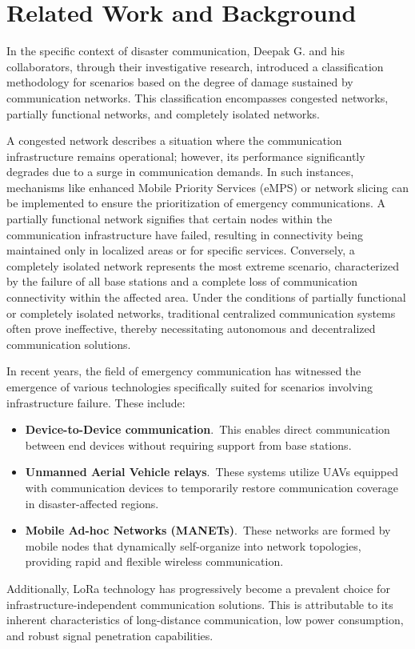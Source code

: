 \section{Related Work and Background}
In the specific context of disaster communication, Deepak G. and his collaborators, through their investigative research, introduced a classification methodology for scenarios based on the degree of damage sustained by communication networks. This classification encompasses congested networks, partially functional networks, and completely isolated networks\cite{Post-DisasterEmergencyCommunicationSystems}.

A congested network describes a situation where the communication infrastructure remains operational; however, its performance significantly degrades due to a surge in communication demands. In such instances, mechanisms like enhanced Mobile Priority Services (eMPS) or network slicing can be implemented to ensure the prioritization of emergency communications. A partially functional network signifies that certain nodes within the communication infrastructure have failed, resulting in connectivity being maintained only in localized areas or for specific services. Conversely, a completely isolated network represents the most extreme scenario, characterized by the failure of all base stations and a complete loss of communication connectivity within the affected area. Under the conditions of partially functional or completely isolated networks, traditional centralized communication systems often prove ineffective, thereby necessitating autonomous and decentralized communication solutions.

In recent years, the field of emergency communication has witnessed the emergence of various technologies specifically suited for scenarios involving infrastructure failure. These include:
    \begin{itemize}
        \item \textbf{Device-to-Device communication}.\ This enables direct communication between end devices without requiring support from base stations.
        \item \textbf{Unmanned Aerial Vehicle relays}.\  These systems utilize UAVs equipped with communication devices to temporarily restore communication coverage in disaster-affected regions.
        \item \textbf{Mobile Ad-hoc Networks (MANETs)}.\ These networks are formed by mobile nodes that dynamically self-organize into network topologies, providing rapid and flexible wireless communication.
    \end{itemize}
    
Additionally, LoRa technology has progressively become a prevalent choice for infrastructure-independent communication solutions. This is attributable to its inherent characteristics of long-distance communication, low power consumption, and robust signal penetration capabilities.



